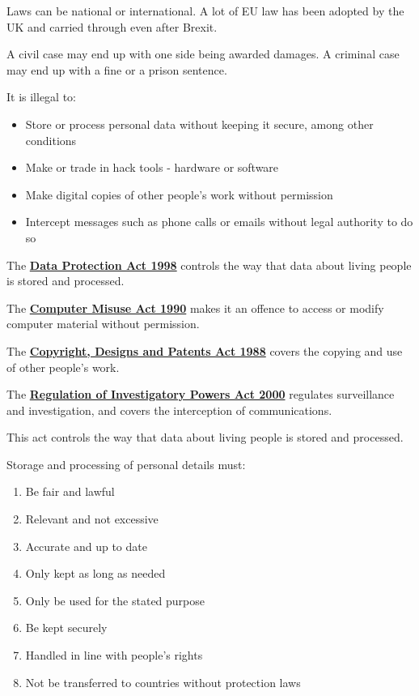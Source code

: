\documentclass[../main.tex]{subfile}
\begin{document}

Laws can be national or international. A lot of EU law has been adopted by the UK and carried through even after Brexit.

A civil case may end up with one side being awarded damages. A criminal case may end up with a fine or a prison sentence.

It is illegal to: \begin{itemize}
	\item Store or process personal data without keeping it secure, among other conditions
	\item Make or trade in hack tools - hardware or software
	\item Make digital copies of other people's work without permission
	\item Intercept messages such as phone calls or emails without legal authority to do so
\end{itemize}


The \hyperref[data-protection-act]{\textbf{Data Protection Act 1998}} controls the way that data about living people is stored and processed.

The \hyperref[computer-misuse-act]{\textbf{Computer Misuse Act 1990}} makes it an offence to access or modify computer material without permission.

The \hyperref[copyright-designs-and-patents-act]{\textbf{Copyright, Designs and Patents Act 1988}} covers the copying and use of other people's work.

The \hyperref[regulation-of-investigatory-powers-act]{\textbf{Regulation of Investigatory Powers Act 2000}} regulates surveillance and investigation, and covers the interception of communications.


This act controls the way that data about living people is stored and processed.

Storage and processing of personal details must: \begin{enumerate}
	\item Be fair and lawful
	\item Relevant and not excessive
	\item Accurate and up to date
	\item Only kept as long as needed
	\item Only be used for the stated purpose
	\item Be kept securely
	\item Handled in line with people's rights
	\item Not be transferred to countries without protection laws
\end{enumerate}
\end{document}
